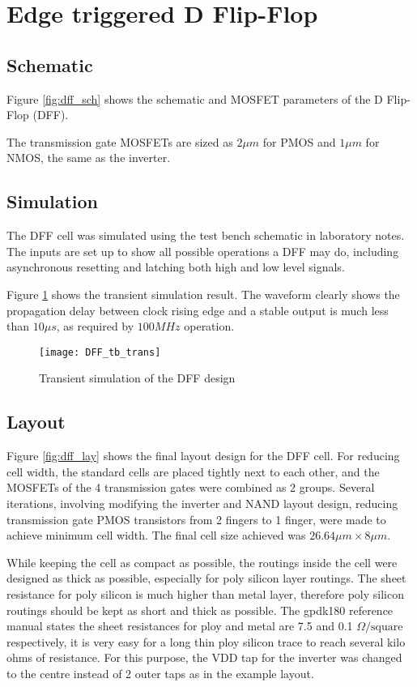 \section{Edge triggered D Flip-Flop}

\subsection{Schematic}

Figure \ref{fig:dff_sch} shows the schematic and MOSFET parameters of the D Flip-Flop (DFF).

The transmission gate MOSFETs are sized as $2 \mu m$ for PMOS and $1 \mu m$ for NMOS, the same as the inverter.

\subsection{Simulation}

The DFF cell was simulated using the test bench schematic in laboratory notes. The inputs are set up to show all possible operations a DFF may do, including asynchronous resetting and latching both high and low level signals.

Figure \ref{fig:dff_trans} shows the transient simulation result. The waveform clearly shows the propagation delay between clock rising edge and a stable output is much less than $10 \mu s$, as required by $100 MHz$ operation.

\begin{figure}[!htb]
	\centering
	\texttt{[image: DFF\_tb\_trans]}
	\caption{Transient simulation of the DFF design}
	\label{fig:dff_trans}
\end{figure}

\subsection{Layout}

Figure \ref{fig:dff_lay} shows the final layout design for the DFF cell. For reducing cell width, the standard cells are placed tightly next to each other, and the MOSFETs of the 4 transmission gates were combined as 2 groups. Several iterations, involving modifying the inverter and NAND layout design, reducing transmission gate PMOS transistors from 2 fingers to 1 finger, were made to achieve minimum cell width. The final cell size achieved was $26.64 \mu m \times 8 \mu m$.

While keeping the cell as compact as possible, the routings inside the cell were designed as thick as possible, especially for poly silicon layer routings. The sheet resistance for poly silicon is much higher than metal layer, therefore poly silicon routings should be kept as short and thick as possible. The gpdk180 reference manual states the sheet resistances for ploy and metal are 7.5 and 0.1 $\Omega / \text{square}$ respectively, it is very easy for a long thin ploy silicon trace to reach several kilo ohms of resistance. For this purpose, the VDD tap for the inverter was changed to the centre instead of 2 outer taps as in the example layout.

